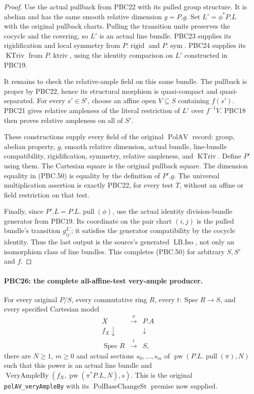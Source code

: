 \documentclass[11pt,a4paper]{article}
\numberwithin{equation}{section}
\theoremstyle{remark}\newtheorem{remark}[theorem]{Remark}
\begin{document}
\begin{proof}
Use the actual pullback from PBC22 with its pulled group
structure.  It is abelian and has the same smooth relative
dimension $g=P.g$.  Set $L'=\phi^*P.L$ with the original
pullback charts.  Pulling the transition units preserves
the cocycle and the covering, so $L'$ is an actual line bundle.
PBC23 supplies its rigidification and local symmetry from
$P.\operatorname{rigid}$ and $P.\operatorname{sym}$.
PBC24 supplies its $\operatorname{KTriv}$ from
$P.\operatorname{ktriv}$, using the identity comparison
on $L'$ constructed in PBC19.

It remains to check the relative-ample field on this same
bundle.  The pullback is proper by PBC22, hence its
structural morphism is quasi-compact and quasi-separated.
For every $s'\in S'$, choose an affine open $V\subseteq S$
containing $f(s')$.  PBC21 gives relative ampleness of the
literal restriction of $L'$ over $f^{-1}V$.
PBC18 then proves relative ampleness on all of $S'$.

These constructions supply every field of the original
$\operatorname{PolAV}$ record: group, abelian property,
$g$, smooth relative dimension, actual bundle, line-bundle
compatibility, rigidification, symmetry, relative ampleness,
and $\operatorname{KTriv}$.  Define $P'$ using them.
The Cartesian square is the original pullback square.
The dimension equality in (PBC.50) is equality by the
definition of $P'.g$.  The universal multiplication assertion
is exactly PBC22, for every test $T$, without an affine or
field restriction on that test.

Finally, since $P'.L=P.L.\operatorname{pull}(\phi)$,
use the actual identity division-bundle generator from
PBC19.  Its coordinate on the pair chart $(i,j)$ is the
pulled bundle's transition $g^{L'}_{ij}$; it satisfies
the generator compatibility by the cocycle identity.
Thus the last output is the source's generated
$\operatorname{LB.Iso}$, not only an isomorphism class
of line bundles.  This completes (PBC.50) for arbitrary
$S,S'$ and $f$.
\end{proof}

\paragraph{PBC26: the complete all-affine-test very-ample producer.}
\label{claim:PBC26}
For every original $P/S$, every commutative ring $R$, every
$t:\operatorname{Spec}R\to S$, and every specified Cartesian
model
\[
 \begin{array}{ccc}
 X&\xrightarrow{\pi}&P.A\\
 f_X\downarrow&&\downarrow\\
 \operatorname{Spec}R&\xrightarrow{t}&S,
 \end{array}
\]
there are $N\ge1$, $m\ge0$ and actual sections
$s_0,\ldots,s_m$ of
$\operatorname{pw}(P.L.\operatorname{pull}(\pi),N)$
such that this power is an actual line bundle and
$\operatorname{VeryAmpleBy}(f_X,\operatorname{pw}(\pi^*P.L,N),s)$.
This is the original \texttt{pol\allowbreak AV\_\allowbreak very\allowbreak Ample\allowbreak By} with its
$\operatorname{PolBaseChangeSt}$ premise now supplied.
\end{document}
